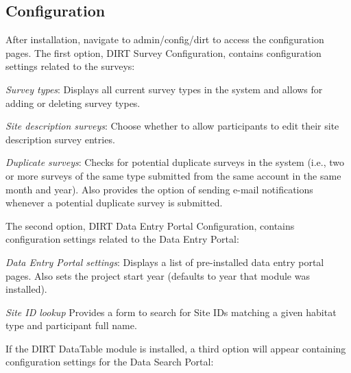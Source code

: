 \subsection*{Configuration}

After installation, navigate to admin/config/dirt to access the configuration pages. The first option, D\+I\+RT Survey Configuration, contains configuration settings related to the surveys\+:


\begin{DoxyItemize}
\item {\itshape Survey types}\+: Displays all current survey types in the system and allows for adding or deleting survey types.
\item {\itshape Site description surveys}\+: Choose whether to allow participants to edit their site description survey entries.
\item {\itshape Duplicate surveys}\+: Checks for potential duplicate surveys in the system (i.\+e., two or more surveys of the same type submitted from the same account in the same month and year). Also provides the option of sending e-\/mail notifications whenever a potential duplicate survey is submitted.
\end{DoxyItemize}

The second option, D\+I\+RT Data Entry Portal Configuration, contains configuration settings related to the Data Entry Portal\+:


\begin{DoxyItemize}
\item {\itshape Data Entry Portal settings}\+: Displays a list of pre-\/installed data entry portal pages. Also sets the project start year (defaults to year that module was installed).
\item {\itshape Site ID lookup} Provides a form to search for Site I\+Ds matching a given habitat type and participant full name.
\end{DoxyItemize}

If the D\+I\+RT Data\+Table module is installed, a third option will appear containing configuration settings for the Data Search Portal\+:


